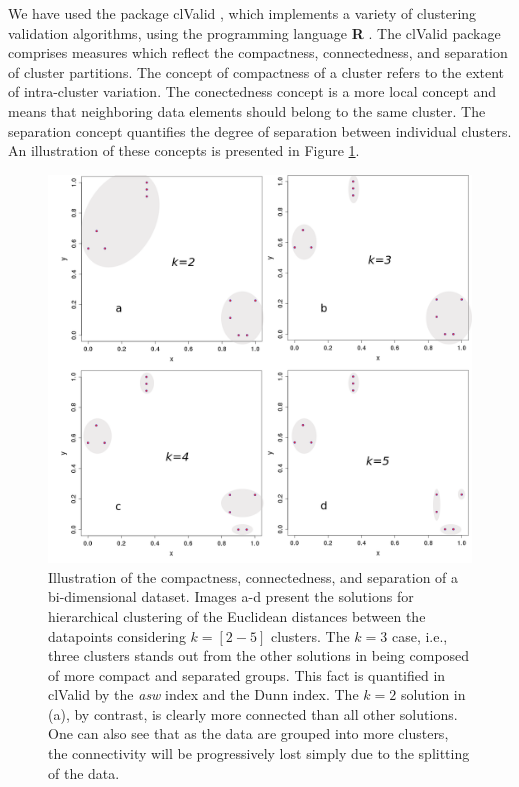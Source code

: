 We have used the  package clValid \cite{brock2008}, which implements a
variety  of clustering  validation algorithms,  using  the programming
language  \textbf{R}  \cite{rcite}.   The  clValid  package  comprises
measures which reflect  the compactness, connectedness, and separation
of cluster partitions. The concept  of compactness of a cluster refers
to the extent of  intra-cluster variation. The conectedness concept is
a more local  concept and means that neighboring  data elements should
belong  to the  same cluster.  The separation  concept  quantifies the
degree of separation between  individual clusters.  An illustration of
these concepts is presented in Figure \ref{fig:concomsep}.

\begin{figure}
\centering
\includegraphics[scale=0.36]{Appendix/consilcom.png}
\caption{Illustration   of   the   compactness,   connectedness,   and
  separation  of  a bi-dimensional  dataset.  Images  a-d present  the
  solutions  for hierarchical  clustering of  the  Euclidean distances
  between  the datapoints considering  $k=[2-5]$ clusters.   The $k=3$
  case, i.e.,  three clusters stands  out from the other  solutions in
  being composed of  more compact and separated groups.   This fact is
  quantified in clValid by the  \textit{asw} index and the Dunn index.
  The $k=2$  solution in (a),  by contrast, is clearly  more connected
  than all  other solutions.  One can  also see that  as the  data are
  grouped into  more clusters, the connectivity  will be progressively
  lost simply due to the splitting of the data.}
\label{fig:concomsep}
\end{figure}  

